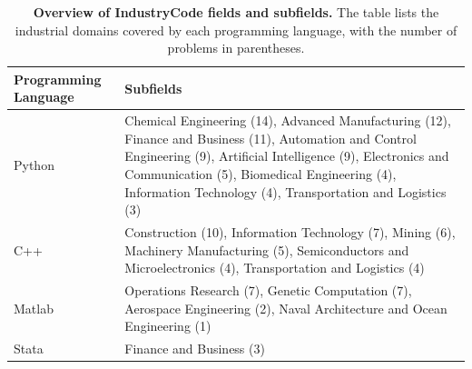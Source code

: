 \documentclass{article}
\theoremstyle{plain}
\theoremstyle{definition}
\theoremstyle{remark}
\begin{document}
\begin{table}[t] %
  \caption{\textbf{Overview of IndustryCode fields and subfields.} The table lists the industrial domains covered by each programming language, with the number of problems in parentheses.}
  \label{fields-table}
  \begin{center}
    \begin{small}
      \begin{tabular}{lp{13cm}}
        \toprule
        \textbf{Programming Language} & \textbf{Subfields} \\
        \midrule
        Python & Chemical Engineering (14), Advanced Manufacturing (12), Finance and Business (11), Automation and Control Engineering (9), Artificial Intelligence (9),  Electronics and Communication (5), Biomedical Engineering (4), Information Technology (4), Transportation and Logistics (3)\\
        \midrule
        C++ & Construction (10), Information Technology (7), Mining (6), Machinery Manufacturing (5), Semiconductors and Microelectronics (4), Transportation and Logistics (4) \\
        \midrule
        Matlab & Operations Research (7), Genetic Computation (7), Aerospace Engineering (2), Naval Architecture and Ocean Engineering (1) \\
        \midrule
        Stata & Finance and Business (3) \\
        \bottomrule
      \end{tabular}
    \end{small}
  \end{center}

  \vskip -0.1in
  
\end{table}
\end{document}
